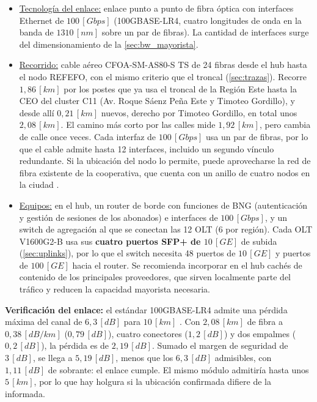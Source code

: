 \begin{itemize}
    \item \underline{Tecnología del enlace:} enlace punto a punto de fibra óptica con interfaces Ethernet de $100 \, [Gbps]$ (100GBASE-LR4, cuatro longitudes de onda en la banda de $1310 \, [nm]$ sobre un par de fibras). La cantidad de interfaces surge del dimensionamiento de la \autoref{sec:bw_mayorista}.
    \item \underline{Recorrido:} cable aéreo CFOA-SM-AS80-S TS de 24 fibras desde el hub hasta el nodo REFEFO, con el mismo criterio que el troncal (\autoref{sec:trazas}). Recorre $1{,}86 \, [km]$ por los postes que ya usa el troncal de la Región Este hasta la CEO del cluster C11 (Av. Roque Sáenz Peña Este y Timoteo Gordillo), y desde allí $0{,}21 \, [km]$ nuevos, derecho por Timoteo Gordillo, en total unos $2{,}08 \, [km]$. El camino más corto por las calles mide $1{,}92 \, [km]$, pero cambia de calle once veces. Cada interfaz de $100 \, [Gbps]$ usa un par de fibras, por lo que el cable admite hasta 12 interfaces, incluido un segundo vínculo redundante. Si la ubicación del nodo lo permite, puede aprovecharse la red de fibra existente de la cooperativa, que cuenta con un anillo de cuatro nodos en la ciudad \cite{coyspu}.
    \item \underline{Equipos:} en el hub, un router de borde con funciones de BNG (autenticación y gestión de sesiones de los abonados) e interfaces de $100 \, [Gbps]$, y un switch de agregación al que se conectan las 12 OLT (6 por región). Cada OLT V1600G2-B usa sus \textbf{cuatro puertos SFP+ de $10 \, [GE]$} de subida \cite{vsol_olt} (\autoref{sec:uplinks}), por lo que el switch necesita 48 puertos de $10 \, [GE]$ y puertos de $100 \, [GE]$ hacia el router. Se recomienda incorporar en el hub cachés de contenido de los principales proveedores, que sirven localmente parte del tráfico y reducen la capacidad mayorista necesaria.
\end{itemize}

\textbf{Verificación del enlace:} el estándar 100GBASE-LR4 admite una pérdida máxima del canal de $6{,}3 \, [dB]$ para $10 \, [km]$ \cite{lr4_ieee}. Con $2{,}08 \, [km]$ de fibra a $0{,}38 \, [dB/km]$ ($0{,}79 \, [dB]$), cuatro conectores ($1{,}2 \, [dB]$) y dos empalmes ($0{,}2 \, [dB]$), la pérdida es de $2{,}19 \, [dB]$. Sumado el margen de seguridad de $3 \, [dB]$, se llega a $5{,}19 \, [dB]$, menos que los $6{,}3 \, [dB]$ admisibles, con $1{,}11 \, [dB]$ de sobrante: el enlace cumple. El mismo módulo admitiría hasta unos $5 \, [km]$, por lo que hay holgura si la ubicación confirmada difiere de la informada.

